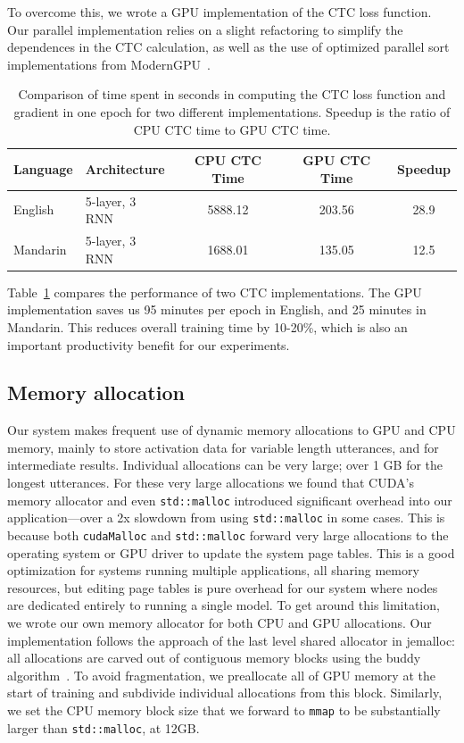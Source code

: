 To overcome this, we wrote a GPU implementation of the CTC loss function. Our
parallel implementation relies on a slight refactoring to simplify the
dependences in the CTC calculation, as well as the use of optimized parallel
sort implementations from ModernGPU~\cite{baxter2013}.

\begin{table}
\centering
\begin{tabular}{l  l  c  c  c}
\toprule
Language  & Architecture   & CPU CTC Time & GPU CTC Time  & Speedup  \\
\midrule
English   & 5-layer, 3 RNN & 5888.12      & 203.56        & 28.9     \\
Mandarin  & 5-layer, 3 RNN & 1688.01      & 135.05        & 12.5     \\
\bottomrule
\end{tabular}
\caption{Comparison of time spent in seconds in computing the CTC loss function
         and gradient in one epoch for two different implementations. Speedup is the
         ratio of CPU CTC time to GPU CTC time.}
\label{table:deepspeech2:gpucpuctc}
\end{table}

Table~\ref{table:deepspeech2:gpucpuctc} compares the performance of two CTC
implementations. The GPU implementation saves us 95 minutes per epoch in
English, and 25 minutes in Mandarin. This reduces overall training time by
10-20\%, which is also an important productivity benefit for our experiments.


\subsection{Memory allocation}

Our system makes frequent use of dynamic memory allocations to GPU and CPU
memory, mainly to store activation data for variable length utterances, and for
intermediate results. Individual allocations can be very large; over 1 GB for
the longest utterances.  For these very large allocations we found that CUDA's
memory allocator and even \texttt{std::malloc} introduced significant overhead
into our application---over a 2x slowdown from using \texttt{std::malloc} in
some cases. This is because both \texttt{cudaMalloc} and \texttt{std::malloc}
forward very large allocations to the operating system or GPU driver to update
the system page tables. This is a good optimization for systems running
multiple applications, all sharing memory resources, but editing page tables is
pure overhead for our system where nodes are dedicated entirely to running a
single model. To get around this limitation, we wrote our own memory allocator
for both CPU and GPU allocations. Our implementation follows the approach of
the last level shared allocator in jemalloc: all allocations are carved out of
contiguous memory blocks using the buddy algorithm~\cite{knowlton1965}. To
avoid fragmentation, we preallocate all of GPU memory at the start of training
and subdivide individual allocations from this block. Similarly, we set the CPU
memory block size that we forward to \texttt{mmap} to be substantially larger
than \texttt{std::malloc}, at 12GB.

